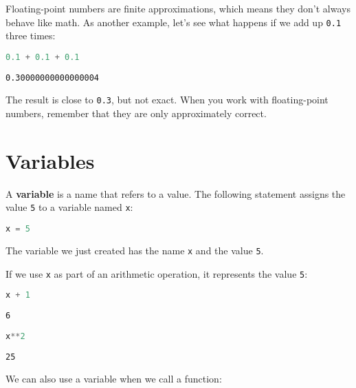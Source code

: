 Floating-point numbers are finite approximations, which means they don't
always behave like math. As another example, let's see what happens if
we add up \passthrough{\lstinline!0.1!} three times:

\begin{lstlisting}[language=Python,style=source]
0.1 + 0.1 + 0.1
\end{lstlisting}

\begin{lstlisting}[style=output]
0.30000000000000004
\end{lstlisting}

The result is close to \passthrough{\lstinline!0.3!}, but not exact.
When you work with floating-point numbers, remember that they are only
approximately correct.

\hypertarget{variables}{%
\section{Variables}\label{variables}}

A \textbf{variable} is a name that refers to a value. The following
statement assigns the value \passthrough{\lstinline!5!} to a variable
named \passthrough{\lstinline!x!}:

\begin{lstlisting}[language=Python,style=source]
x = 5
\end{lstlisting}

The variable we just created has the name \passthrough{\lstinline!x!}
and the value \passthrough{\lstinline!5!}.

If we use \passthrough{\lstinline!x!} as part of an arithmetic
operation, it represents the value \passthrough{\lstinline!5!}:

\begin{lstlisting}[language=Python,style=source]
x + 1
\end{lstlisting}

\begin{lstlisting}[style=output]
6
\end{lstlisting}

\begin{lstlisting}[language=Python,style=source]
x**2
\end{lstlisting}

\begin{lstlisting}[style=output]
25
\end{lstlisting}

We can also use a variable when we call a function:


